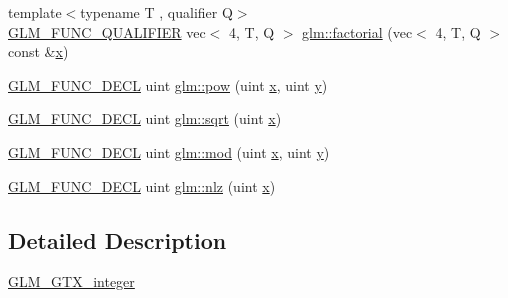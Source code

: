 \begin{DoxyCompactItemize}
\item 
{\footnotesize template$<$typename T , qualifier Q$>$ }\\\hyperlink{setup_8hpp_a33fdea6f91c5f834105f7415e2a64407}{G\+L\+M\+\_\+\+F\+U\+N\+C\+\_\+\+Q\+U\+A\+L\+I\+F\+I\+ER} vec$<$ 4, T, Q $>$ \hyperlink{namespaceglm_a10d116af23a576c1e52a6d720b051ca3}{glm\+::factorial} (vec$<$ 4, T, Q $>$ const \&\hyperlink{_s_d_l__opengl_8h_ad0e63d0edcdbd3d79554076bf309fd47}{x})
\item 
\hyperlink{setup_8hpp_ab2d052de21a70539923e9bcbf6e83a51}{G\+L\+M\+\_\+\+F\+U\+N\+C\+\_\+\+D\+E\+CL} uint \hyperlink{group__gtx__integer_gaa8229e850c3cc4ad83492fe390ada044}{glm\+::pow} (uint \hyperlink{_s_d_l__opengl_8h_ad0e63d0edcdbd3d79554076bf309fd47}{x}, uint \hyperlink{_s_d_l__opengl_8h_a1675d9d7bb68e1657ff028643b4037e3}{y})
\item 
\hyperlink{setup_8hpp_ab2d052de21a70539923e9bcbf6e83a51}{G\+L\+M\+\_\+\+F\+U\+N\+C\+\_\+\+D\+E\+CL} uint \hyperlink{group__gtx__integer_ga457e9efca8339bf918d319e9c55f7c8f}{glm\+::sqrt} (uint \hyperlink{_s_d_l__opengl_8h_ad0e63d0edcdbd3d79554076bf309fd47}{x})
\item 
\hyperlink{setup_8hpp_ab2d052de21a70539923e9bcbf6e83a51}{G\+L\+M\+\_\+\+F\+U\+N\+C\+\_\+\+D\+E\+CL} uint \hyperlink{group__gtx__integer_gab8f9ec0ca93ca90669434224818f0750}{glm\+::mod} (uint \hyperlink{_s_d_l__opengl_8h_ad0e63d0edcdbd3d79554076bf309fd47}{x}, uint \hyperlink{_s_d_l__opengl_8h_a1675d9d7bb68e1657ff028643b4037e3}{y})
\item 
\hyperlink{setup_8hpp_ab2d052de21a70539923e9bcbf6e83a51}{G\+L\+M\+\_\+\+F\+U\+N\+C\+\_\+\+D\+E\+CL} uint \hyperlink{group__gtx__integer_gacbe62fd2384464c16ea30ecc4defc11c}{glm\+::nlz} (uint \hyperlink{_s_d_l__opengl_8h_ad0e63d0edcdbd3d79554076bf309fd47}{x})
\end{DoxyCompactItemize}


\subsection{Detailed Description}
\hyperlink{group__gtx__integer}{G\+L\+M\+\_\+\+G\+T\+X\+\_\+integer} 